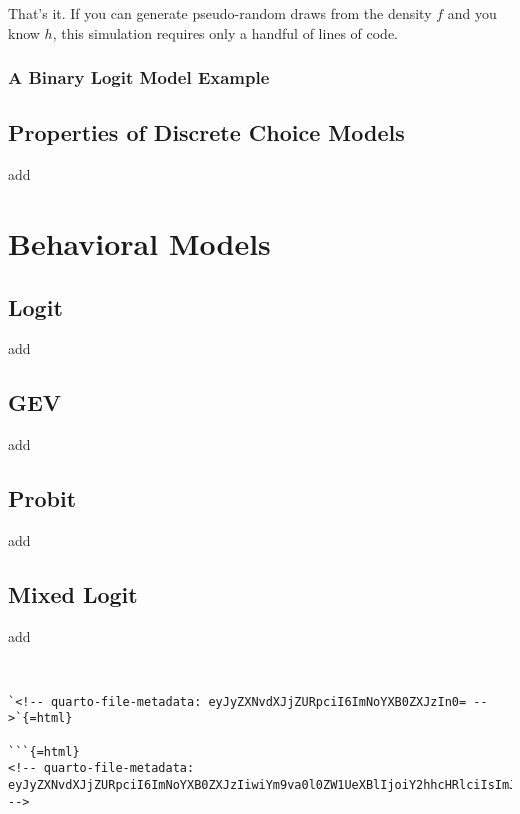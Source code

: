 \documentclass[
  letterpaper,
  DIV=11,
  numbers=noendperiod]{scrreprt}
\begin{document}
That's it. If you can generate pseudo-random draws from the density
\(f\) and you know \(h\), this simulation requires only a handful of
lines of code.

\section{A Binary Logit Model Example}\label{sec-binary_logit}

\chapter{Properties of Discrete Choice Models}\label{sec-properties}

add

\part{Behavioral Models}

\chapter{Logit}\label{sec-logit}

add

\chapter{GEV}\label{sec-gev}

add

\chapter{Probit}\label{sec-probit}

add

\chapter{Mixed Logit}\label{sec-mixedlogit}

add

\begin{verbatim}


`<!-- quarto-file-metadata: eyJyZXNvdXJjZURpciI6ImNoYXB0ZXJzIn0= -->`{=html}

```{=html}
<!-- quarto-file-metadata: eyJyZXNvdXJjZURpciI6ImNoYXB0ZXJzIiwiYm9va0l0ZW1UeXBlIjoiY2hhcHRlciIsImJvb2tJdGVtTnVtYmVyIjo3LCJib29rSXRlbUZpbGUiOiJjaGFwdGVycy8wN192YXJpYXRpb25zLnFtZCIsImJvb2tJdGVtRGVwdGgiOjF9 -->
\end{verbatim}
\end{document}
